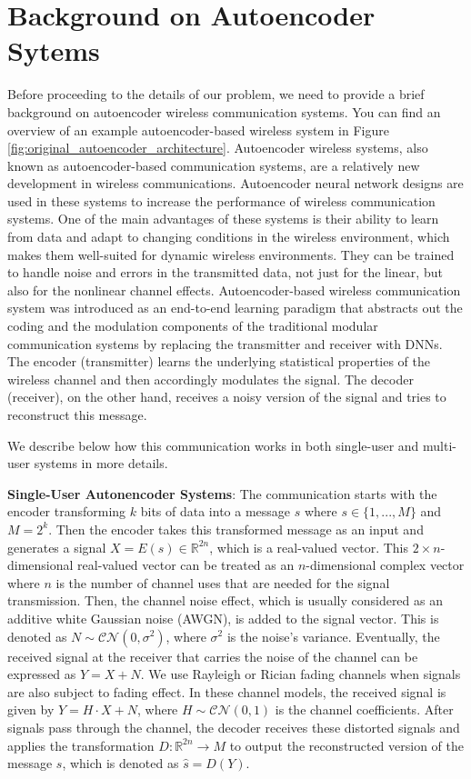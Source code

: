 \section{Background on Autoencoder Sytems}

Before proceeding to the details of our problem, we need to provide a brief background on autoencoder wireless communication systems. You can find an overview of an example autoencoder-based wireless system in Figure \ref{fig:original_autoencoder_architecture}.
Autoencoder wireless systems, also known as autoencoder-based communication systems, are a relatively new development in wireless communications. Autoencoder neural network designs \cite{baldi2012autoencoders} are used in these systems to increase the performance of wireless communication systems. One of the main advantages of these systems is their ability to learn from data and adapt to changing conditions in the wireless environment, which makes them well-suited for dynamic wireless environments. They can be trained to handle noise and errors in the transmitted data, not just for the linear, but also for the nonlinear channel effects.
Autoencoder-based wireless communication system was introduced as an end-to-end learning paradigm that abstracts out the coding and the modulation components of the traditional modular communication systems by replacing the transmitter and receiver with DNNs. The encoder (transmitter) learns the underlying statistical properties of the wireless channel and then accordingly modulates the signal. The decoder (receiver), on the other hand, receives a noisy version of the signal and tries to reconstruct this message. 

We describe below how this communication works in both single-user and multi-user systems in more details.

\textbf{Single-User Autonencoder Systems}: The communication starts with the encoder transforming \(k\) bits of data into a message \(s\) where \(s \in \{1,...,M\}\) and \(M = 2^k\). Then the encoder takes this transformed message as an input and generates a signal \(X = E(s) \in \mathbb{R}^{2n}\), which is a real-valued vector. This \(2 \times n\)-dimensional real-valued vector can be treated as an \(n\)-dimensional complex vector where \(n\) is the number of channel uses that are needed for the signal transmission. Then, the channel noise effect, which is usually considered as an additive white Gaussian noise (AWGN), is added to the signal vector. This is denoted as \(N \sim \mathcal{CN}(0, \sigma^2)\), where \(\sigma^2\) is the noise's variance. Eventually, the received signal at the receiver that carries the noise of the channel can be expressed as \(Y = X + N\). We use Rayleigh or Rician fading channels when signals are also subject to fading effect. In these channel models, the received signal is given by \(Y = H \cdot X + N\), where \(H \sim \mathcal{CN}(0, 1)\) is the channel coefficients. After signals pass through the channel, the decoder receives these distorted signals and applies the transformation \(D: \mathbb{R}^{2n} \rightarrow M \) to output the reconstructed version of the message \(s\), which is  denoted as \(\hat{s} = D(Y)\).

